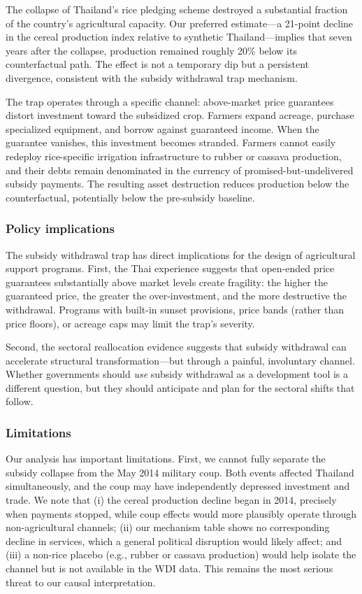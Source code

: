 \documentclass[12pt]{article}
\begin{document}
The collapse of Thailand's rice pledging scheme destroyed a substantial fraction of the country's agricultural capacity. Our preferred estimate---a 21-point decline in the cereal production index relative to synthetic Thailand---implies that seven years after the collapse, production remained roughly 20\% below its counterfactual path. The effect is not a temporary dip but a persistent divergence, consistent with the subsidy withdrawal trap mechanism.

The trap operates through a specific channel: above-market price guarantees distort investment toward the subsidized crop. Farmers expand acreage, purchase specialized equipment, and borrow against guaranteed income. When the guarantee vanishes, this investment becomes stranded. Farmers cannot easily redeploy rice-specific irrigation infrastructure to rubber or cassava production, and their debts remain denominated in the currency of promised-but-undelivered subsidy payments. The resulting asset destruction reduces production below the counterfactual, potentially below the pre-subsidy baseline.

\subsubsection*{Policy implications} The subsidy withdrawal trap has direct implications for the design of agricultural support programs. First, the Thai experience suggests that open-ended price guarantees substantially above market levels create fragility: the higher the guaranteed price, the greater the over-investment, and the more destructive the withdrawal. Programs with built-in sunset provisions, price bands (rather than price floors), or acreage caps may limit the trap's severity.

Second, the sectoral reallocation evidence suggests that subsidy withdrawal can accelerate structural transformation---but through a painful, involuntary channel. Whether governments should \textit{use} subsidy withdrawal as a development tool is a different question, but they should anticipate and plan for the sectoral shifts that follow.

\subsubsection*{Limitations} Our analysis has important limitations. First, we cannot fully separate the subsidy collapse from the May 2014 military coup. Both events affected Thailand simultaneously, and the coup may have independently depressed investment and trade. We note that (i) the cereal production decline began in 2014, precisely when payments stopped, while coup effects would more plausibly operate through non-agricultural channels; (ii) our mechanism table shows no corresponding decline in services, which a general political disruption would likely affect; and (iii) a non-rice placebo (e.g., rubber or cassava production) would help isolate the channel but is not available in the WDI data. This remains the most serious threat to our causal interpretation.
\end{document}
